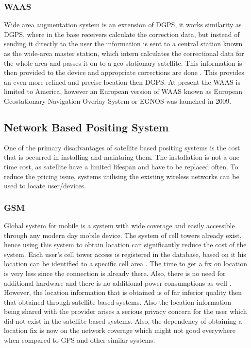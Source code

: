 \documentclass[12pt]{report}
\begin{document}
\subsubsection{WAAS}

Wide area augmentation system is an extension of DGPS, it works similarity as DGPS, where in the base receivers calculate the correction data, but instead of sending it directly to the user the information is sent to a central station known as the wide-area master station, which intern calculates the correctional data for the whole area and passes it on to a geo-stationary satellite. This information is then provided to the device and appropriate corrections are done \cite{corrections2004comparing}. This provides an even more refined and precise location then DGPS. At present the WAAS is limited to America, however an European version of WAAS known as European Geostationary Navigation Overlay System or EGNOS was launched in 2009.


\subsection{Network Based Positing System}


One of the primary disadvantages of satellite based positing systems is the cost that is occurred in installing and maintaing them. The installation is not a one time cost, as satellite have a limited lifespan and have to be replaced often. To reduce the pricing issue, systems utilising the existing wireless networks can be used to locate user/devices.

\subsubsection{GSM}
Global system for mobile is a system with wide coverage and easily accessible through any modern day mobile device. The system of cell towers already exist, hence using this system to obtain location can significantly reduce the cost of the system. Each user's cell tower access is registered in the database, based on it his location can be identified to a specific cell area \cite{schiller2004location}.  The time to get a fix on location is very less since the connection is already there. Also, there is no need for additional hardware and there is no additional power consumptions as well \cite{djuknic2001geolocation}. However, the location information that is obtained is of far inferior quality then that obtained through satellite based systems. Also the location information being shared with the provider arises a serious privacy concern for the user which did not exist in the satellite based systems. Also, the dependency of obtaining a location fix is now on the network coverage which might not good everywhere when compared to GPS and other similar systems.
\end{document}
